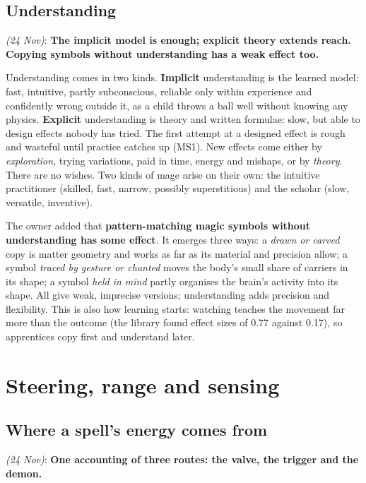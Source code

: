 \documentclass[11pt,a4paper]{article}
\newcommand{\decision}[3]{\par\smallskip\noindent{\color{dec}\textbf{Decision #1}} \textit{(#2)}: \textbf{#3}\par}
\begin{document}
\subsection{Understanding}

\decision{Q3.5}{24 Nov}{The implicit model is enough; explicit theory extends reach. Copying symbols without understanding has a weak effect too.}

Understanding comes in two kinds. \textbf{Implicit} understanding is the learned model: fast, intuitive, partly subconscious, reliable only within experience and confidently wrong outside it, as a child throws a ball well without knowing any physics. \textbf{Explicit} understanding is theory and written formulae: slow, but able to design effects nobody has tried. The first attempt at a designed effect is rough and wasteful until practice catches up (MS1). New effects come either by \emph{exploration}, trying variations, paid in time, energy and mishaps, or by \emph{theory}. There are no wishes. Two kinds of mage arise on their own: the intuitive practitioner (skilled, fast, narrow, possibly superstitious) and the scholar (slow, versatile, inventive).

The owner added that \textbf{pattern-matching magic symbols without understanding has some effect}. It emerges three ways: a \emph{drawn or carved} copy is matter geometry and works as far as its material and precision allow; a symbol \emph{traced by gesture or chanted} moves the body's small share of carriers in its shape; a symbol \emph{held in mind} partly organises the brain's activity into its shape. All give weak, imprecise versions; understanding adds precision and flexibility. This is also how learning starts: watching teaches the movement far more than the outcome (the library found effect sizes of 0.77 against 0.17), so apprentices copy first and understand later.

\section{Steering, range and sensing}\label{sec:range}

\subsection{Where a spell's energy comes from}

\decision{Q4.1}{24 Nov}{One accounting of three routes: the valve, the trigger and the demon.}
\end{document}
